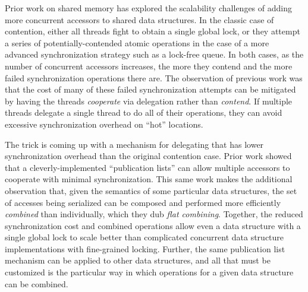 Prior work on shared memory has explored the scalability challenges of adding more concurrent accessors to shared data structures.
In the classic case of contention, either all threads fight to obtain a single global lock, or they attempt a series of potentially-contended atomic operations in the case of a more advanced synchronization strategy such as a lock-free queue. In both cases, as the number of concurrent accessors increases, the more they contend and the more failed synchronization operations there are.
The observation of previous work was that the cost of many of these failed synchronization attempts can be mitigated by having the threads \emph{cooperate} via delegation rather than \emph{contend}.
If multiple threads delegate a single thread to do all of their operations, they can avoid excessive synchronization overhead on ``hot'' locations.

The trick is coming up with a mechanism for delegating that has lower synchronization overhead than the original contention case.
Prior work showed that a cleverly-implemented ``publication lists'' can allow multiple accessors to cooperate with minimal synchronization.
This same work makes the additional observation that, given the semantics of some particular data structures, the set of accesses being serialized can be composed and performed more efficiently \emph{combined} than individually, which they dub \emph{flat combining}.
Together, the reduced synchronization cost and combined operations allow even a data structure with a single global lock to scale better than complicated concurrent data structure implementations with fine-grained locking.
Further, the same publication list mechanism can be applied to other data structures, and all that must be customized is the particular way in which operations for a given data structure can be combined.


